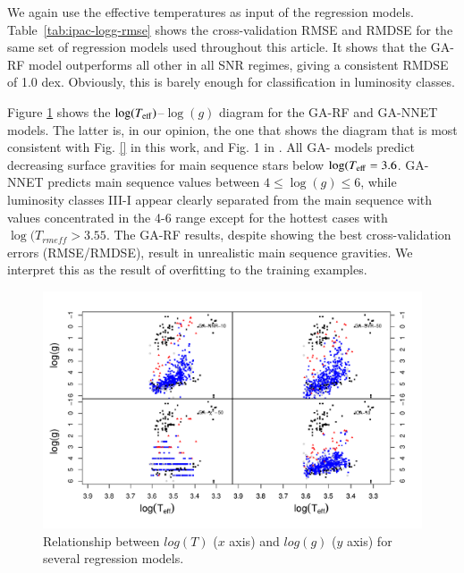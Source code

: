 We again use the effective temperatures as input of the regression
models. Table~\ref{tab:ipac-logg-rmse} shows the cross-validation RMSE
and RMDSE for the same set of regression models used throughout this
article. It shows that the GA-RF model outperforms all other in all
SNR regimes, giving a consistent RMDSE of 1.0 dex. Obviously, this is
barely enough for classification in luminosity classes.


Figure \ref{fig:teffvsloggIPAC} shows the $\log(T_{\rm
  eff})$--$\log(g)$ diagram for the GA-RF and GA-NNET models. The
  latter is, in our opinion, the one that shows the diagram that is
  most consistent with Fig. \ref{} in this work, and Fig. 1
  in \cite{cesetti}. All GA- models predict decreasing surface
  gravities for main sequence stars below $\log(T_{\rm
  eff}=3.6$. GA-NNET predicts main sequence values between
  $4 \le \log(g) \le6$, while luminosity classes III-I appear clearly
  separated from the main sequence with values concentrated in the 4-6
  range except for the hottest cases with $\log(T_{rm eff} >
  3.55$. The GA-RF results, despite showing the best cross-validation
  errors (RMSE/RMDSE), result in unrealistic main sequence
  gravities. We interpret this as the result of overfitting to the
  training examples.

\begin{figure}
 \begin{center}
 \includegraphics[width=\textwidth]{figs/ipac-teff-logg.pdf}
 \caption{Relationship between $log(T) $ ($x$ axis) 
 and $log(g)$ ($y$ axis) for several regression models.}
 \label{fig:teffvsloggIPAC}
 \end{center}
\end{figure}

